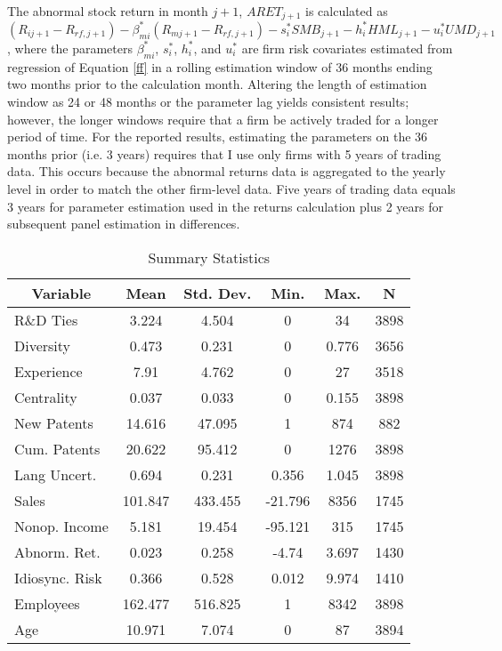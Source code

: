 The abnormal stock return in month $j+1$, $ARET_{j+1}$ is calculated as $(R_{ij+1}-R_{rf,j+1})-\beta_{mi}^*(R_{mj+1}-R_{rf,j+1})-s_i^*SMB_{j+1}-h_i^*HML_{j+1}-u_i^*UMD_{j+1}$, where the parameters $\beta_{mi}^*$, $s_i^*$, $h_i^*$, and $u_i^*$ are firm risk covariates estimated from regression of Equation \ref{ff} in a rolling estimation window of 36 months ending two months prior to the calculation month. Altering the length of estimation window as 24 or 48 months or the parameter lag yields consistent results; however, the longer windows require that a firm be actively traded for a longer period of time. For the reported results, estimating the parameters on the 36 months prior (i.e. 3 years) requires that I use only firms with 5 years of trading data. This occurs because the abnormal returns data is aggregated to the yearly level in order to match the other firm-level data. Five years of trading data equals 3 years for parameter estimation used in the returns calculation plus 2 years for subsequent panel estimation in differences. 


\begin{table}[htbp]\centering \caption{Summary Statistics \label{sumstat}}
\begin{tabular}{l c c c c c}\hline\hline
\multicolumn{1}{c}{\textbf{Variable}} & \textbf{Mean}
 & \textbf{Std. Dev.}& \textbf{Min.} &  \textbf{Max.} & \textbf{N}\\ \hline
R\&D Ties & 3.224 & 4.504 & 0 & 34 & 3898\\
Diversity & 0.473 & 0.231 & 0 & 0.776 & 3656\\
Experience & 7.91 & 4.762 & 0 & 27 & 3518\\
Centrality & 0.037 & 0.033 & 0 & 0.155 & 3898\\
New Patents & 14.616 & 47.095 & 1 & 874 & 882\\
Cum. Patents & 20.622 & 95.412 & 0 & 1276 & 3898\\
Lang Uncert. &  0.694 & 0.231 & 0.356 & 1.045 & 3898\\
Sales & 101.847 & 433.455 & -21.796 & 8356 & 1745\\
Nonop. Income & 5.181 & 19.454 & -95.121 & 315 & 1745\\
Abnorm. Ret. & 0.023 & 0.258 & -4.74 & 3.697 & 1430\\
Idiosync. Risk & 0.366 & 0.528 & 0.012 & 9.974 & 1410\\
Employees & 162.477 & 516.825 & 1 & 8342 & 3898\\
Age & 10.971 & 7.074 & 0 & 87 & 3894\\
\hline\end{tabular}
\end{table}

